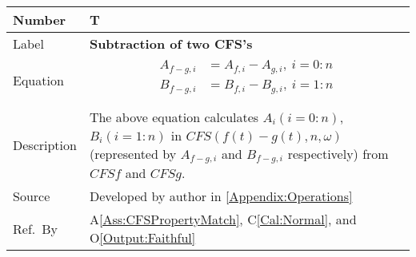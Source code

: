 \documentclass[12pt]{article}
\newcommand{\colAwidth}{0.13\textwidth}
\newcommand{\colBwidth}{0.82\textwidth}
\newcounter{theorynum} %
\newcommand{\aref}[1]{A\ref{#1}}
\newcommand{\calref}[1]{C\ref{#1}}
\newcommand{\oref}[1]{O\ref{#1}}
\begin{document}
\begin{minipage}{\textwidth}
	\renewcommand*{\arraystretch}{1.5}
	\begin{tabular}{| p{\colAwidth} | p{\colBwidth}|}
		\hline
		\rowcolor[gray]{0.9}
		Number& T{theorynum}\thetheorynum 
		\label{T:Subtraction}\\
		\hline
		Label&\bf Subtraction of two CFS's\\
		\hline
		Equation&  
		\begin{equation}
		\begin{aligned}
		A_{f-g, i}
		&=A_{f, i} - A_{g, i},~i=0:n\\
		B_{f-g, i}
		&=B_{f, i} - B_{g, i},~i=1:n\\
		\end{aligned}
		\end{equation}\\
		\hline
		Description & The above equation calculates 
		$A_i(i=0:n)$, $B_i(i=1:n)$ in 
		$\mathit{CFS}(f(t)-g(t), n, \omega)$ 
		(represented by $A_{f-g, i}$ and $B_{f-g, i}$ respectively) 
		from $\mathit{CFSf}$ and $\mathit{CFSg}$.\\
		\hline
		Source & Developed by author in \autoref{Appendix:Operations}\\
		\hline
		Ref.\ By & \aref{Ass:CFSPropertyMatch}, \calref{Cal:Normal}, 
		and \oref{Output:Faithful}\\
		\hline
	\end{tabular}
\end{minipage}\\

~\newline
\end{document}
